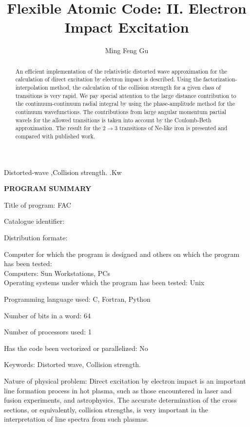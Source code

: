 \documentclass{elsart}
\begin{document}
\begin{frontmatter}

\title{Flexible Atomic Code: II. Electron Impact Excitation} 
\author{Ming Feng Gu}
\address{Massachusetts Institute of Technology, Cambridge, MA 02139, USA}

\begin{abstract}
An efficient implementation of the relativistic distorted wave approximation
for the calculation of direct excitation by electron impact is
described. Using the factorization-interpolation method, the calculation of
the collision strength 
for a given class of transitions is very rapid. We pay special attention to
the large distance contribution to the continuum-continuum radial
integral by using the phase-amplitude method for the continuum
wavefunctions. The 
contributions from large angular momentum partial wavels for the allowed
transitions is taken into account by the Coulomb-Beth approximation. The
result for the $2\to 3$ transitions of Ne-like iron is presented and compared
with published work.  
\end{abstract}

\begin{keyword}
Distorted-wave \sep Collision strength.
.Kw
\end{keyword}
\end{frontmatter}

\textbf{\large PROGRAM SUMMARY}

Title of program: FAC

Catalogue identifier:

Distribution formate:

Computer for which the program is designed and others on which the program has
been tested:\\
Computers: Sun Workstations, PCs\\
Operating systems under which the program has been tested: Unix

Programming language used: C, Fortran, Python

Number of bits in a word: 64

Number of processors used: 1

Has the code been vectorized or parallelized: No

Keywords: Distorted wave, Collision strength.

Nature of physical problem: Direct excitation by electron impact is an
important line formation process in hot plasma, such as those encountered in
laser and fusion experiments, and astrophysics. The accurate determination of
the cross sections, or equivalently, collision strengths, is very important
in the interpretation of line spectra from such plasmas.
\end{document}
